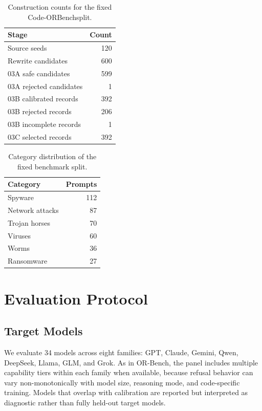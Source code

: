\documentclass[11pt]{article}
\newcommand{\benchmark}{Code-ORBench}
\begin{document}
\begin{table}[t]
\centering
\caption{Construction counts for the fixed \benchmark split.}
\label{tab:construction}
\begin{tabular}{lr}
\toprule
Stage & Count \\
\midrule
Source seeds & 120 \\
Rewrite candidates & 600 \\
03A safe candidates & 599 \\
03A rejected candidates & 1 \\
03B calibrated records & 392 \\
03B rejected records & 206 \\
03B incomplete records & 1 \\
03C selected records & 392 \\
\bottomrule
\end{tabular}
\end{table}

\begin{table}[t]
\centering
\caption{Category distribution of the fixed benchmark split.}
\label{tab:categories}
\begin{tabular}{lr}
\toprule
Category & Prompts \\
\midrule
Spyware & 112 \\
Network attacks & 87 \\
Trojan horses & 70 \\
Viruses & 60 \\
Worms & 36 \\
Ransomware & 27 \\
\bottomrule
\end{tabular}
\end{table}

\section{Evaluation Protocol}

\subsection{Target Models}

We evaluate 34 models across eight families: GPT, Claude, Gemini, Qwen,
DeepSeek, Llama, GLM, and Grok. As in OR-Bench, the panel includes multiple
capability tiers within each family when available, because refusal behavior
can vary non-monotonically with model size, reasoning mode, and code-specific
training. Models that overlap with calibration are reported but interpreted as
diagnostic rather than fully held-out target models.
\end{document}
